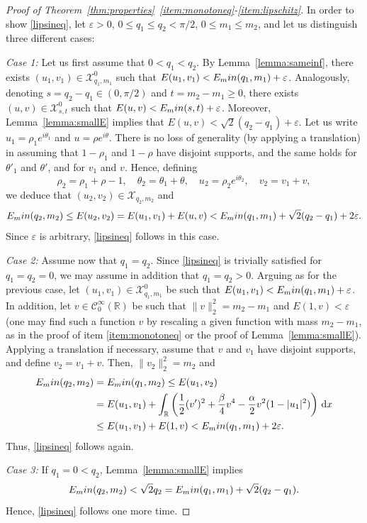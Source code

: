\documentclass[10pt,a4paper]{amsart}
\newcommand{\Emin}{E_\textup{min}}
\newcommand{\R}{\mathbb{R}}
\newcommand{\boC}{\mathcal{C}}
\newcommand{\boX}{\mathcal{X}}
\renewcommand{\d}{\,\mathrm{d}}
\begin{document}
\begin{proof}[Proof of Theorem~\ref{thm:properties}~\ref{item:monotoneq}-\ref{item:lipschitz}]
In order to show \eqref{lipsineq}, let $\varepsilon>0$, $0\leq q_1\leq q_2<\pi/2$, $0\leq m_1\leq m_2$, and let us distinguish three different cases:

\emph{Case 1:} Let us first assume that $0<q_1<q_2$. By Lemma~\ref{lemma:sameinf}, there exists $(u_1,v_1)\in\boX_{q_1,m_1}^0$ such that $E(u_1,v_1)<\Emin(q_1,m_1)+\varepsilon$. Analogously, denoting $s=q_2-q_1\in (0,\pi/2)$ and $t=m_2-m_1\geq 0$, there exists $(u,v)\in\boX_{s,t}^0$ such that $E(u,v)<\Emin(s,t)+\varepsilon$. Moreover, Lemma~\ref{lemma:smallE}  implies that $E(u,v)<\sqrt{2}(q_2-q_1)+\varepsilon$. Let us write $u_1=\rho_1 e^{i\theta_1}$ and $u=\rho e^{i\theta}$. There is no loss of generality (by applying a translation) in assuming that $1-\rho_1$ and $1-\rho$ have disjoint supports, and the same holds for $\theta'_1$ and $\theta'$, and for $v_1$ and $v$. Hence, defining 
\[\rho_2=\rho_1+\rho-1,\quad\theta_2=\theta_1+\theta,\quad u_2=\rho_2 e^{i\theta_2},\quad v_2=v_1+ v,\]
we deduce that $(u_2,v_2)\in \boX_{q_2,m_2}$ and
\[\Emin(q_2,m_2)\leq E(u_2,v_2)=E(u_1,v_1)+E(u,v)<\Emin(q_1,m_1)+\sqrt{2}(q_2-q_1)+2\varepsilon.\]
Since $\varepsilon$ is arbitrary, \eqref{lipsineq} follows in this case. 

\emph{Case 2:} Assume now that $q_1=q_2$. Since \eqref{lipsineq} is trivially satisfied for $q_1=q_2=0$, we may assume in addition that $q_1=q_2>0$. Arguing as for the previous case, let $(u_1,v_1)\in\boX_{q_1,m_1}^0$ be such that $E(u_1,v_1)<\Emin(q_1,m_1)+\varepsilon$. In addition, let $v\in\boC_0^\infty(\R)$ be such that $\|v\|_2^2=m_2-m_1$ and $E(1,v)<\varepsilon$ (one may find such a function $v$ by rescaling a given function with mass $m_2-m_1$, as in the proof of item \ref{item:monotoneq} or the proof of Lemma~\ref{lemma:smallE}). Applying a translation if necessary, assume that $v$ and $v_1$ have disjoint supports, and define $v_2=v_1+v$. Then, $\|v_2\|_2^2=m_2$ and
\begin{align*}
\Emin(q_2,m_2)&=\Emin(q_1,m_2)\leq E(u_1,v_2)
\\
&=E(u_1,v_1)+\int_\R\left(\frac12(v')^2+\frac{\beta}{4}v^4-\frac{\alpha}{2}v^2(1-|u_1|^2)\right)\d x
\\
&\leq E(u_1,v_1)+E(1,v)<\Emin(q_1,m_1)+2\varepsilon.    
\end{align*}
Thus, \eqref{lipsineq} follows again.

\emph{Case 3:} If $q_1=0<q_2$, {Lemma~\ref{lemma:smallE}} implies
\[\Emin(q_2,m_2)<\sqrt{2}q_2=\Emin(q_1,m_1)+\sqrt{2}(q_2-q_1).\]
Hence, \eqref{lipsineq} follows one more time.


\end{proof}
\end{document}
